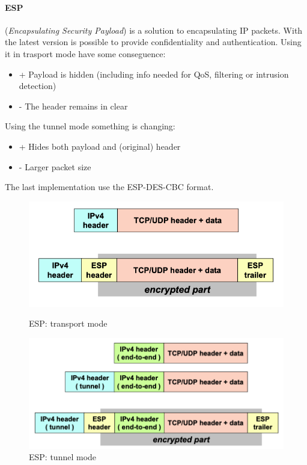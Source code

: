 \documentclass[12pt]{article}
\begin{document}
\paragraph{ESP} (\textit{Encapsulating Security Payload}) is a solution to encapsulating IP packets. With the latest version is possible to provide confidentiality and authentication. Using it in trasport mode have some conseguence:
\begin{itemize}
  \item {+} Payload is hidden (including info needed for QoS, filtering or intrusion detection)
  \item {-} The header remains in clear
\end{itemize}
Using the tunnel mode something is changing:
\begin{itemize}
  \item {+} Hides both payload and (original) header
  \item {-} Larger packet size
\end{itemize}
The last implementation use the ESP-DES-CBC format.
\begin{figure}[h!]
  \centering
  \begin{minipage}{.48\textwidth}
    \centering
    \includegraphics[width=\linewidth]{images/esp-transport.png}
    \caption{ESP: transport mode}
    \label{fig:esp-transport}
  \end{minipage}\hfill
  \begin{minipage}{.48\textwidth}
    \centering
    \includegraphics[width=\linewidth]{images/esp-tunnel.png}
    \caption{ESP: tunnel mode}
    \label{fig:esp-tunnel}
  \end{minipage}\hfill
\end{figure}
\end{document}
